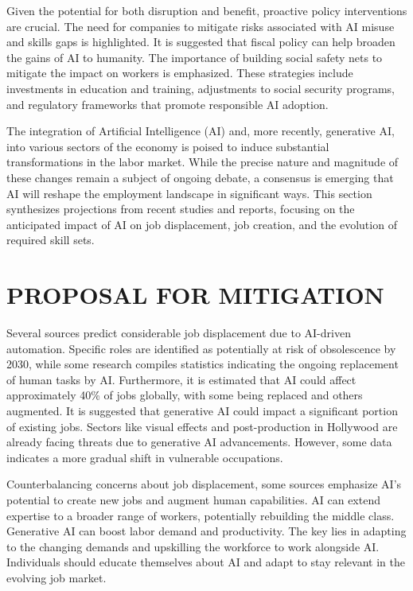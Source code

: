 \documentclass[a4paper,headinclude=on,footinclude=on,12pt,oneside]{scrbook}
\begin{document}

Given the potential for both disruption and benefit, proactive policy interventions are crucial. The need for companies to mitigate risks associated with AI misuse and skills gaps is highlighted. It is suggested that fiscal policy can help broaden the gains of AI to humanity. The importance of building social safety nets to mitigate the impact on workers is emphasized. These strategies include investments in education and training, adjustments to social security programs, and regulatory frameworks that promote responsible AI adoption.


The integration of Artificial Intelligence (AI) and, more recently, generative AI, into various sectors of the economy is poised to induce substantial transformations in the labor market. While the precise nature and magnitude of these changes remain a subject of ongoing debate, a consensus is emerging that AI will reshape the employment landscape in significant ways. This section synthesizes projections from recent studies and reports, focusing on the anticipated impact of AI on job displacement, job creation, and the evolution of required skill sets.

\section{PROPOSAL FOR MITIGATION}


Several sources predict considerable job displacement due to AI-driven automation. Specific roles are identified as potentially at risk of obsolescence by 2030, while some research compiles statistics indicating the ongoing replacement of human tasks by AI. Furthermore, it is estimated that AI could affect approximately 40\% of jobs globally, with some being replaced and others augmented. It is suggested that generative AI could impact a significant portion of existing jobs. Sectors like visual effects and post-production in Hollywood are already facing threats due to generative AI advancements. However, some data indicates a more gradual shift in vulnerable occupations.


Counterbalancing concerns about job displacement, some sources emphasize AI’s potential to create new jobs and augment human capabilities. AI can extend expertise to a broader range of workers, potentially rebuilding the middle class. Generative AI can boost labor demand and productivity. The key lies in adapting to the changing demands and upskilling the workforce to work alongside AI. Individuals should educate themselves about AI and adapt to stay relevant in the evolving job market.
\end{document}
